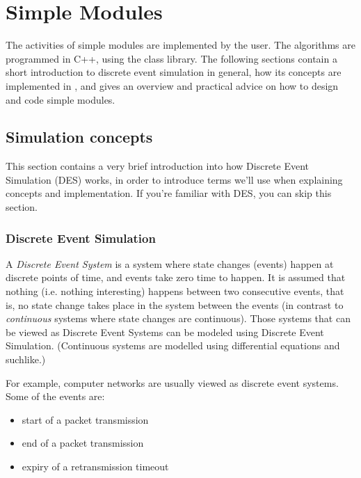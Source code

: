 \chapter{Simple Modules}
\label{cha:simple-modules}

The activities of simple modules are implemented by the user. 
The algorithms are programmed in C++, using the {\opp} class 
library. The following sections contain a short introduction 
to discrete event simulation in general, how its concepts are 
implemented in {\opp}, and gives an overview and practical advice 
on how to design and code simple modules.





\section{Simulation concepts}

This section contains a very brief introduction into how Discrete
Event Simulation (DES) works, in order to introduce terms we'll use
when explaining {\opp} concepts and
implementation. If you're familiar with DES, you can skip this
section.





\subsection{Discrete Event Simulation}

A \textit{Discrete Event System} is a system where state changes
(events) happen at discrete points of time, and events take zero time
to happen. It is assumed that nothing (i.e. nothing interesting)
happens between two consecutive events, that is, no state change takes
place in the system between the events (in contrast to
\textit{continuous} systems where state changes are continuous). Those
systems that can be viewed as Discrete Event Systems can be modeled
using Discrete Event Simulation.
(Continuous systems are modelled using differential equations and
suchlike.)

For example, computer networks are usually viewed as discrete 
event systems. Some of the events are:
\begin{itemize}
\item{start of a packet transmission}
\item{end of a packet transmission}
\item{expiry of a retransmission timeout}
\end{itemize}


